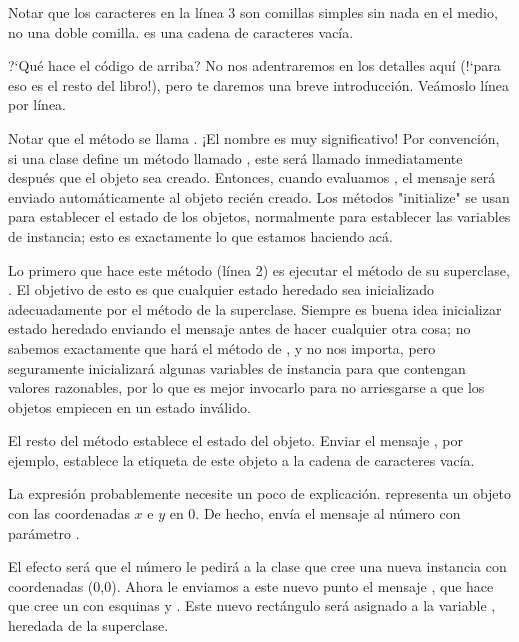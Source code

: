 \documentclass[a4paper,10pt,twoside]{book}
\begin{document}
\noindent
Notar que los caracteres  en la l\'inea 3 son comillas simples sin nada en el medio, no una doble comilla.  es una cadena de caracteres vac\'ia. 


?`Qu\'e hace el c\'odigo de arriba? No nos adentraremos en los detalles aqu\'i (!`para eso es el resto del libro!), pero te daremos una breve introducci\'on. Ve\'amoslo l\'inea por l\'inea.

Notar que el m\'etodo se llama .
¡El nombre es muy significativo!
Por convenci\'on, si una clase define un m\'etodo llamado , este ser\'a llamado inmediatamente despu\'es que el objeto sea creado. 
Entonces, cuando evaluamos , el mensaje  ser\'a enviado autom\'aticamente al objeto reci\'en creado. 
Los m\'etodos "initialize" se usan para establecer el estado de los objetos, normalmente para establecer las variables de instancia; esto es exactamente lo que estamos haciendo ac\'a. 

Lo primero que hace este m\'etodo (l\'inea 2) es ejecutar el m\'etodo  de su superclase, .
El objetivo de esto es que cualquier estado heredado sea inicializado adecuadamente por el m\'etodo  de la superclase.
Siempre es buena idea inicializar estado heredado enviando el mensaje  antes de hacer cualquier otra cosa; no sabemos exactamente que har\'a el m\'etodo  de , y no nos importa, pero seguramente inicializar\'a algunas variables de instancia para que contengan valores razonables, por lo que es mejor invocarlo para no arriesgarse a que los objetos empiecen en un estado inv\'alido.

El resto del m\'etodo establece el estado del objeto.
Enviar el mensaje , por ejemplo, establece la etiqueta de este objeto a la cadena de caracteres vac\'ia.

La expresi\'on  probablemente necesite un poco de explicaci\'on.
 representa un objeto  con las coordenadas $x$ e $y$ en 0.
De hecho,  env\'ia el mensaje  al n\'umero  con par\'ametro .

El efecto ser\'a que el n\'umero  le pedir\'a a la clase  que cree una nueva instancia con coordenadas (0,0).
Ahora le enviamos a este nuevo punto el mensaje , que hace que cree un  con esquinas  y .
Este nuevo rect\'angulo ser\'a asignado a la variable , heredada de la superclase. 
\end{document}
